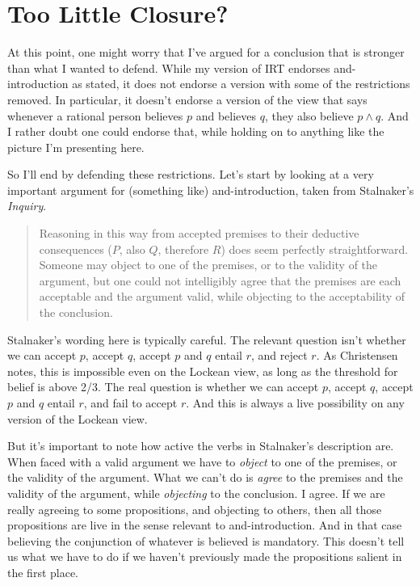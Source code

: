 \documentclass[11pt,]{book}
\begin{document}
\hypertarget{toolittleclosure}{%
\section{Too Little Closure?}\label{toolittleclosure}}

At this point, one might worry that I've argued for a conclusion that is stronger than what I wanted to defend. While my version of IRT endorses and-introduction as stated, it does not endorse a version with some of the restrictions removed. In particular, it doesn't endorse a version of the view that says whenever a rational person believes \(p\) and believes \(q\), they also believe \(p \wedge q\). And I rather doubt one could endorse that, while holding on to anything like the picture I'm presenting here.

So I'll end by defending these restrictions. Let's start by looking at a very important argument for (something like) and-introduction, taken from Stalnaker's \emph{Inquiry}.

\begin{quote}
Reasoning in this way from accepted premises to their deductive consequences (\(P\), also \(Q\), therefore \(R\)) does seem perfectly straightforward. Someone may object to one of the premises, or to the validity of the argument, but one could not intelligibly agree that the premises are each acceptable and the argument valid, while objecting to the acceptability of the conclusion. \citep[ 92]{Stalnaker1984}
\end{quote}

Stalnaker's wording here is typically careful. The relevant question isn't whether we can accept \(p\), accept \(q\), accept \(p\) and \(q\) entail \(r\), and reject \(r\). As Christensen \citeyearpar[ Ch. 4]{Christensen2005} notes, this is impossible even on the Lockean view, as long as the threshold for belief is above 2/3. The real question is whether we can accept \(p\), accept \(q\), accept \(p\) and \(q\) entail \(r\), and fail to accept \(r\). And this is always a live possibility on any version of the Lockean view.

But it's important to note how active the verbs in Stalnaker's description are. When faced with a valid argument we have to \emph{object} to one of the premises, or the validity of the argument. What we can't do is \emph{agree} to the premises and the validity of the argument, while \emph{objecting} to the conclusion. I agree. If we are really agreeing to some propositions, and objecting to others, then all those
propositions are live in the sense relevant to and-introduction. And in that case believing the conjunction of whatever is believed is mandatory. This doesn't tell us what we have to do if we haven't previously made the propositions salient in the first place.
\end{document}
